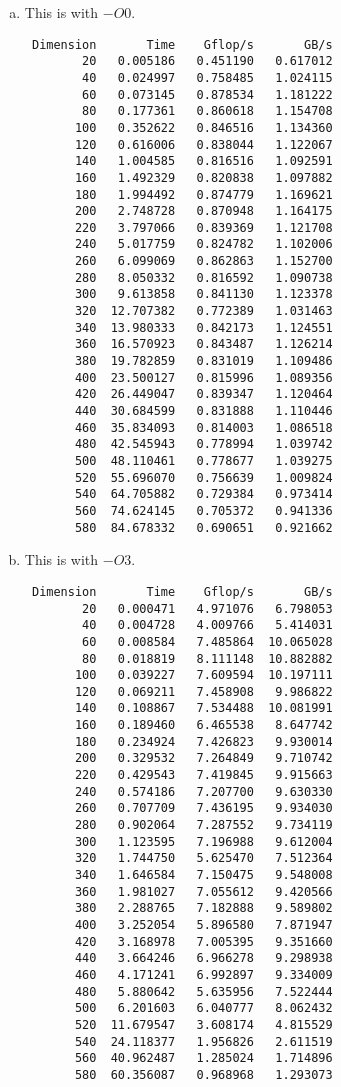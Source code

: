\documentclass[12pt]{article}
\begin{document}
\begin{enumerate}[(a)]

\item This is with $-O0$.

\begin{verbatim}
 Dimension       Time    Gflop/s       GB/s
        20   0.005186   0.451190   0.617012
        40   0.024997   0.758485   1.024115
        60   0.073145   0.878534   1.181222
        80   0.177361   0.860618   1.154708
       100   0.352622   0.846516   1.134360
       120   0.616006   0.838044   1.122067
       140   1.004585   0.816516   1.092591
       160   1.492329   0.820838   1.097882
       180   1.994492   0.874779   1.169621
       200   2.748728   0.870948   1.164175
       220   3.797066   0.839369   1.121708
       240   5.017759   0.824782   1.102006
       260   6.099069   0.862863   1.152700
       280   8.050332   0.816592   1.090738
       300   9.613858   0.841130   1.123378
       320  12.707382   0.772389   1.031463
       340  13.980333   0.842173   1.124551
       360  16.570923   0.843487   1.126214
       380  19.782859   0.831019   1.109486
       400  23.500127   0.815996   1.089356
       420  26.449047   0.839347   1.120464
       440  30.684599   0.831888   1.110446
       460  35.834093   0.814003   1.086518
       480  42.545943   0.778994   1.039742
       500  48.110461   0.778677   1.039275
       520  55.696070   0.756639   1.009824
       540  64.705882   0.729384   0.973414
       560  74.624145   0.705372   0.941336
       580  84.678332   0.690651   0.921662
\end{verbatim}

\item This is with $-O3$.

\begin{verbatim}
 Dimension       Time    Gflop/s       GB/s
        20   0.000471   4.971076   6.798053
        40   0.004728   4.009766   5.414031
        60   0.008584   7.485864  10.065028
        80   0.018819   8.111148  10.882882
       100   0.039227   7.609594  10.197111
       120   0.069211   7.458908   9.986822
       140   0.108867   7.534488  10.081991
       160   0.189460   6.465538   8.647742
       180   0.234924   7.426823   9.930014
       200   0.329532   7.264849   9.710742
       220   0.429543   7.419845   9.915663
       240   0.574186   7.207700   9.630330
       260   0.707709   7.436195   9.934030
       280   0.902064   7.287552   9.734119
       300   1.123595   7.196988   9.612004
       320   1.744750   5.625470   7.512364
       340   1.646584   7.150475   9.548008
       360   1.981027   7.055612   9.420566
       380   2.288765   7.182888   9.589802
       400   3.252054   5.896580   7.871947
       420   3.168978   7.005395   9.351660
       440   3.664246   6.966278   9.298938
       460   4.171241   6.992897   9.334009
       480   5.880642   5.635956   7.522444
       500   6.201603   6.040777   8.062432
       520  11.679547   3.608174   4.815529
       540  24.118377   1.956826   2.611519
       560  40.962487   1.285024   1.714896
       580  60.356087   0.968968   1.293073
\end{verbatim}

\end{enumerate}
\end{document}
